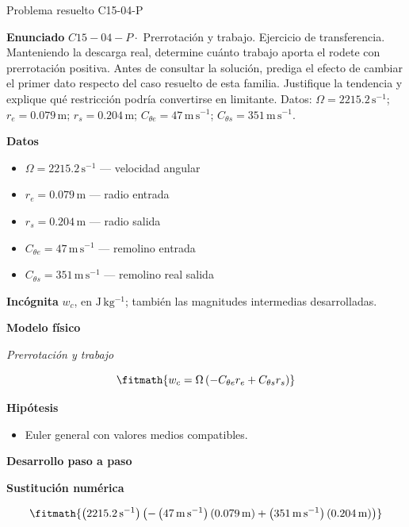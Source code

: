 \documentclass[10pt,openany]{book}
\begin{document}
\begin{studiumworked}{Problema resuelto C15-04-P}


\noindent\textbf{Enunciado}
\(C15-04-P \cdot\) Prerrotación y trabajo. Ejercicio de transferencia. Manteniendo la descarga real, determine cuánto trabajo aporta el rodete con prerrotación positiva. Antes de consultar la solución, prediga el efecto de cambiar el primer dato respecto del caso resuelto de esta familia. Justifique la tendencia y explique qué restricción podría convertirse en limitante. Datos: \(\Omega=2215.2\, \mathrm{s}^{-1}\); \(r_e=0.079\, \mathrm{m}\); \(r_s=0.204\, \mathrm{m}\); \(C_{\theta e}=47\, \mathrm{m}\,\mathrm{s}^{-1}\); \(C_{\theta s}=351\, \mathrm{m}\,\mathrm{s}^{-1}\).

\noindent\textbf{Datos}
\begin{itemize}
\item $\Omega = 2215.2\,\mathrm{s}^{-1}$ — velocidad angular
\item $r_e = 0.079\,\mathrm{m}$ — radio entrada
\item $r_s = 0.204\,\mathrm{m}$ — radio salida
\item $C_{\theta e} = 47\,\mathrm{m}\,\mathrm{s}^{-1}$ — remolino entrada
\item $C_{\theta s} = 351\,\mathrm{m}\,\mathrm{s}^{-1}$ — remolino real salida
\end{itemize}

\noindent\textbf{Incógnita}
$w_c$, en $\mathrm{J\,kg^{-1}}$; también las magnitudes intermedias desarrolladas.

\noindent\textbf{Modelo físico}

\noindent\textit{Prerrotación y trabajo}

\[
\fitmath{w_c=\Omega \left(- C_{\theta e} r_e + C_{\theta s} r_s\right)}
\]

\noindent\textbf{Hipótesis}
\begin{itemize}
\item Euler general con valores medios compatibles.
\end{itemize}

\noindent\textbf{Desarrollo paso a paso}



\noindent\textbf{Sustitución numérica}

\[
\fitmath{\left(2215.2\,\mathrm{s}^{-1}\right) \left(- \left(47\,\mathrm{m}\,\mathrm{s}^{-1}\right) \left(0.079\,\mathrm{m}\right) + \left(351\,\mathrm{m}\,\mathrm{s}^{-1}\right) \left(0.204\,\mathrm{m}\right)\right)}
\]


\end{studiumworked}
\end{document}
